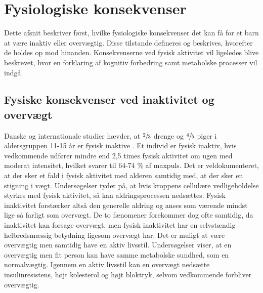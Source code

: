 \section{Fysiologiske konsekvenser}\label{sec:fysio}
Dette afsnit beskriver først, hvilke fysiologiske konsekvenser det kan få for et barn at være inaktiv eller overvægtig. Disse tilstande defineres og beskrives, hvorefter de holdes op mod hinanden. Konsekvenserne ved fysisk aktivitet vil ligeledes blive beskrevet, hvor en forklaring af kognitiv forbedring samt metabolske processer vil indgå.

\subsection{Fysiske konsekvenser ved inaktivitet og overvægt}\label{subsec:inover}
Danske og internationale studier hævder, at $\sfrac{2}{3}$ drenge og $\sfrac{4}{5}$ piger i aldersgruppen 11-15 år er fysisk inaktive \citep{SundhedsstyrrelsenFaktaark}. Et individ er fysisk inaktiv, hvis vedkommende udfører mindre end 2,5 times fysisk aktivitet om ugen med moderat intensitet, hvilket svarer til 64-74 \% af maxpuls. \citep{Kiens2007} Det er veldokumenteret, at der sker et fald i fysisk aktivitet med alderen samtidig med, at der sker en stigning i vægt\citep{Kaprio2008}. Undersøgelser tyder på, at hvis kroppens cellulære vedligeholdelse styrkes med fysisk aktivitet, så kan aldringsprocessen nedsættes\citep{Knight2012}. Fysisk inaktivitet forstærker altså den generelle aldring og anses som værende mindst lige så farligt som overvægt. De to fænomener forekommer dog ofte samtidig, da inaktivitet kan forsage overvægt, men fysisk inaktivitet har en selvstændig helbredsmæssig betydning ligesom overvægt har. Det er muligt at være overvægtig men samtidig have en aktiv livsstil.\citep{Kaprio2008,Kiens2007,Hjort1997} Undersøgelser viser, at en overvægtig men fit person kan have samme metabolske sundhed, som en normalvægtig. Igennem en aktiv livsstil kan en overvægt nedsætte insulinresistens, højt kolesterol og højt bloktryk, selvom vedkommende forbliver overvægtig. \citep{Lunau2012,Marcelino2012}

